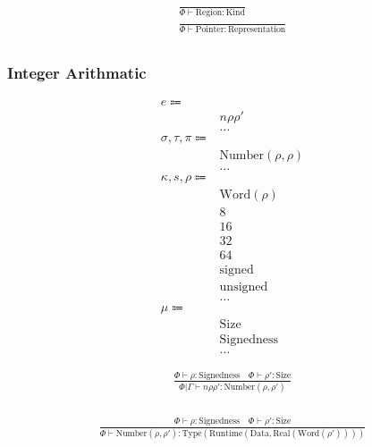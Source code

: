 \documentclass {article}
\begin{document}
\begin{gather*}
\frac
{}
{\Phi \vdash \text{Region} : \text{Kind}} \\
\frac
{}
{\Phi \vdash \text{Pointer} : \text{Representation}} \\
\end{gather*}

\subsubsection{Integer Arithmatic}
\begin{align*}
e \Coloneqq & \\
& n \rho \rho' \tag{Numeric Literal} \\
& \dots \\
\sigma, \tau, \pi \Coloneqq & \\
& \text{Number} (\rho, \rho) \tag{Number} \\
& \dots \\
\kappa, s, \rho \Coloneqq & \\
& \text{Word} (\rho) \tag{Word Representation} \\
& 8 \tag{Byte Size} \\
& 16 \tag{Short Size} \\
& 32 \tag{Int Size} \\
& 64 \tag{Long Size} \\
& \text{signed} \tag{Signed} \\
& \text{unsigned} \tag{Unsigned} \\
& \dots \\
\mu \Coloneqq & \\
& \text{Size} \\
& \text{Signedness} \\
& \dots
\end{align*}

\begin{gather*}
\frac
{\Phi \vdash \rho : \text{Signedness} \quad \Phi \vdash \rho' : \text{Size}}
{\Phi | \Gamma \vdash n \rho \rho' : \text{Number}(\rho, \rho')} \\
\end{gather*}

\begin{gather*}
\frac
{\Phi \vdash \rho : \text{Signedness} \quad \Phi \vdash \rho' : \text{Size}}
{\Phi \vdash \text{Number} (\rho, \rho') : \text{Type} (\text{Runtime} (\text{Data}, \text{Real} (\text{Word} (\rho')))) } \\
\end{gather*}
\end{document}
